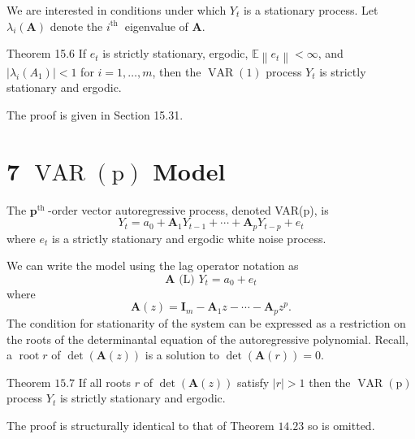\documentclass[10pt]{article}
\begin{document}
We are interested in conditions under which $Y_{t}$ is a stationary process. Let $\lambda_{i}(\boldsymbol{A})$ denote the $i^{\text {th }}$ eigenvalue of $\boldsymbol{A}$.

Theorem 15.6 If $e_{t}$ is strictly stationary, ergodic, $\mathbb{E}\left\|e_{t}\right\|<\infty$, and $\left|\lambda_{i}\left(A_{1}\right)\right|<1$ for $i=1, \ldots, m$, then the $\operatorname{VAR}(1)$ process $Y_{t}$ is strictly stationary and ergodic.

The proof is given in Section 15.31.

\section{7 $\operatorname{VAR}(\mathrm{p})$ Model}
The $\mathbf{p}^{\text {th }}$-order vector autoregressive process, denoted VAR(p), is
$$
Y_{t}=a_{0}+\boldsymbol{A}_{1} Y_{t-1}+\cdots+\boldsymbol{A}_{p} Y_{t-p}+e_{t}
$$
where $e_{t}$ is a strictly stationary and ergodic white noise process.

We can write the model using the lag operator notation as
$$
\boldsymbol{A} \text { (L) } Y_{t}=a_{0}+e_{t}
$$
where
$$
\boldsymbol{A}(z)=\boldsymbol{I}_{m}-\boldsymbol{A}_{1} z-\cdots-\boldsymbol{A}_{p} z^{p} .
$$
The condition for stationarity of the system can be expressed as a restriction on the roots of the determinantal equation of the autoregressive polynomial. Recall, a $\operatorname{root} r$ of $\operatorname{det}(\boldsymbol{A}(z))$ is a solution to $\operatorname{det}(\boldsymbol{A}(r))=0$.

Theorem $15.7$ If all roots $r$ of $\operatorname{det}(\boldsymbol{A}(z))$ satisfy $|r|>1$ then the $\operatorname{VAR}(\mathrm{p})$ process $Y_{t}$ is strictly stationary and ergodic.

The proof is structurally identical to that of Theorem $14.23$ so is omitted.
\end{document}
